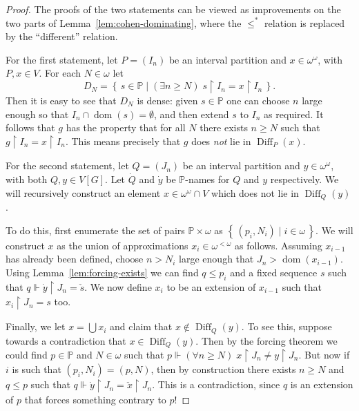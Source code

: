 \documentclass[11pt,oneside]{amsbook}
\newcommand{\set}[1]{\left\{\,#1\,\right\}}
\newcommand{\PP}{\mathbb P}
\newcommand{\forces}{\Vdash}
\DeclareMathOperator{\dom}{dom}
\DeclareMathOperator{\Diff}{Diff}
\theoremstyle{definition}
\theoremstyle{plain}
\theoremstyle{definition}
\theoremstyle{remark}
\numberwithin{equation}{section}
\numberwithin{figure}{section}
\begin{document}
\begin{proof}
  The proofs of the two statements can be viewed as improvements on the two parts of Lemma~\ref{lem:cohen-dominating}, where the $\leq^*$ relation is replaced by the ``different'' relation.
  
  For the first statement, let $P=(I_n)$ be an interval partition and $x\in\omega^\omega$, with $P,x\in V$. For each $N\in\omega$ let
  \[D_N=\set{s\in\PP\mid(\exists n\geq N)\;s\restriction I_n=x\restriction I_n}\text{.}
  \]
  Then it is easy to see that $D_N$ is dense: given $s\in\PP$ one can choose $n$ large enough so that $I_n\cap\dom(s)=\emptyset$, and then extend $s$ to $I_n$ as required. It follows that $g$ has the property that for all $N$ there exists $n\geq N$ such that $g\restriction I_n=x\restriction I_n$. This means precisely that $g$ does \emph{not} lie in $\Diff_P(x)$.

  For the second statement, let $Q=(J_n)$ be an interval partition and $y\in\omega^\omega$, with both $Q,y\in V[G]$. Let $\dot Q$ and $\dot y$ be $\PP$-names for $Q$ and $y$ respectively. We will recursively construct an element $x\in\omega^\omega\cap V$ which does not lie in $\Diff_Q(y)$.

  To do this, first enumerate the set of pairs $\PP\times\omega$ as $\set{(p_i,N_i)\mid i\in\omega}$. We will construct $x$ as the union of approximations $x_i\in\omega^{<\omega}$ as follows. Assuming $x_{i-1}$ has already been defined, choose $n>N_i$ large enough that $J_n>\dom(x_{i-1})$. Using Lemma~\ref{lem:forcing-exists} we can find $q\leq p_i$ and a fixed sequence $s$ such that $q\forces \dot y\restriction J_n=\check s$. We now define $x_i$ to be an extension of $x_{i-1}$ such that $x_i\restriction J_n=s$ too.

  Finally, we let $x=\bigcup x_i$ and claim that $x\notin\Diff_Q(y)$. To see this, suppose towards a contradiction that $x\in\Diff_Q(y)$. Then by the forcing theorem we could find $p\in\PP$ and $N\in\omega$ such that $p\forces(\forall n\geq N)\;x\restriction J_n\neq y\restriction J_n$. But now if $i$ is such that $(p_i,N_i)=(p,N)$, then by construction there exists $n\geq N$ and $q\leq p$ such that $q\forces\dot y\restriction J_n=\check x\restriction J_n$. This is a contradiction, since $q$ is an extension of $p$ that forces something contrary to $p$!
\end{proof}

\end{document}
